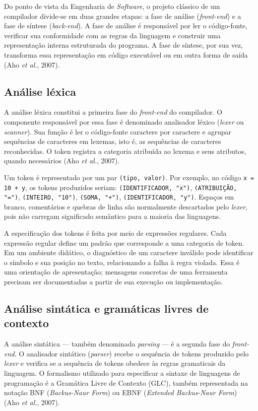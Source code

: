 \documentclass[
    12pt
    ,oneside
    ,a4paper
    ,chapter=TITLE
    ,section=TITLE
    ,sumario=abnt-6027-2012]{abntex2}
\newcommand{\citeAho}{(Aho \textit{et al.}, 2007)}
\begin{document}
Do ponto de vista da Engenharia de \textit{Software}, o projeto clássico de um compilador
divide-se em duas grandes etapas: a fase de análise (\textit{front-end}) e a fase de síntese
(\textit{back-end}). A fase de análise é responsável por ler o código-fonte, verificar sua
conformidade com as regras da linguagem e construir uma representação interna estruturada do
programa. A fase de síntese, por sua vez, transforma essa representação em código executável
ou em outra forma de saída \citeAho.

\subsection{Análise léxica}

A análise léxica constitui a primeira fase do \textit{front-end} do compilador. O componente
responsável por essa fase é denominado analisador léxico (\textit{lexer} ou \textit{scanner}).
Sua função é ler o código-fonte caractere por caractere e agrupar sequências de caracteres em
lexemas, isto é, as sequências de caracteres reconhecidas. O token registra a
categoria atribuída ao lexema e seus atributos, quando necessários \citeAho.

Um token é representado por um par \texttt{(tipo, valor)}. Por exemplo, no código
\texttt{x = 10 + y}, os tokens produzidos seriam:
\texttt{(IDENTIFICADOR, "x")}, \texttt{(ATRIBUIÇÃO, "=")},
\texttt{(INTEIRO, "10")}, \texttt{(SOMA, "+")}, \texttt{(IDENTIFICADOR, "y")}.
Espaços em branco, comentários e quebras de linha são normalmente descartados pelo
\textit{lexer}, pois não carregam significado semântico para a maioria das linguagens.

A especificação dos tokens é feita por meio de expressões regulares. Cada expressão regular
define um padrão que corresponde a uma categoria de token. Em um ambiente
didático, o diagnóstico de um caractere inválido pode identificar o símbolo e
sua posição no texto, relacionando a falha à regra violada. Essa é uma orientação
de apresentação; mensagens concretas de uma ferramenta precisam ser documentadas
a partir de sua execução ou implementação.

\subsection{Análise sintática e gramáticas livres de contexto}

A análise sintática — também denominada \textit{parsing} — é a segunda fase do
\textit{front-end}. O analisador sintático (\textit{parser}) recebe o sequência de
tokens produzido pelo \textit{lexer} e verifica se a sequência de tokens obedece às regras
gramaticais da linguagem. O formalismo utilizado para especificar a sintaxe de linguagens de
programação é a Gramática Livre de Contexto (GLC), também representada na
notação BNF (\textit{Backus-Naur Form}) ou EBNF (\textit{Extended
Backus-Naur Form}) \citeAho.
\end{document}
